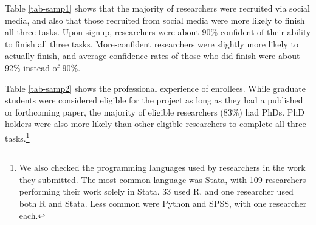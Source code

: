 \documentclass[
  letterpaper,
  DIV=11,
  numbers=noendperiod]{scrartcl}
\begin{document}
Table \ref{tab-samp1} shows that the majority of researchers were
recruited via social media, and also that those recruited from social
media were more likely to finish all three tasks. Upon signup,
researchers were about 90\% confident of their ability to finish all
three tasks. More-confident researchers were slightly more likely to
actually finish, and average confidence rates of those who did finish
were about 92\% instead of 90\%.

\begin{table}[!htbp] \centering \renewcommand*{\arraystretch}{1.1}\caption{Researcher Recruitment Source and Completion Confidence}\label{tab-samp1}
\end{table}

Table \ref{tab-samp2} shows the professional experience of enrollees.
While graduate students were considered eligible for the project as long
as they had a published or forthcoming paper, the majority of eligible
researchers (83\%) had PhDs. PhD holders were also more likely than
other eligible researchers to complete all three tasks.\footnote{We also
  checked the programming languages used by researchers in the work they
  submitted. The most common language was Stata, with 109 researchers
  performing their work solely in Stata. 33 used R, and one researcher
  used both R and Stata. Less common were Python and SPSS, with one
  researcher each.}
\end{document}
